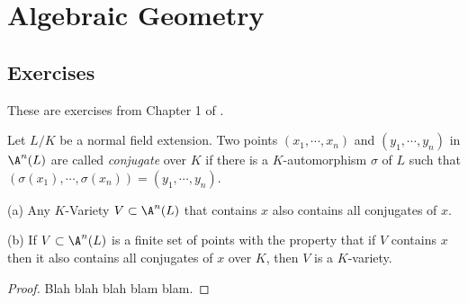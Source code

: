 \documentclass[oneside,12pt]{amsart}
\begin{document}

\section{Algebraic Geometry}


\subsection{Exercises}
These are exercises from Chapter 1 of \cite{Kunz_Book}.

\begin{exercise}
Let $L/K$ be a normal field extension. Two points $(x_1,\cdots,x_n)$ and $(y_1,\cdots,y_n)$ in
$\A^n(L)$ are called \emph{conjugate} over $K$ if there is a $K$-automorphism $\sigma$ of $L$
such that $(\sigma(x_1),\cdots,\sigma(x_n))=(y_1,\cdots,y_n)$.

(a) Any $K$-Variety $V\subset\A^n(L)$ that contains $x$ also contains all conjugates of $x$.

(b) If $V\subset\A^n(L)$ is a finite set of points with the property that if $V$ contains $x$
then it also contains all conjugates of $x$ over $K$, then $V$ is a $K$-variety.
\end{exercise}
\begin{proof}
Blah blah blah blam blam.
\end{proof}





\end{document}
